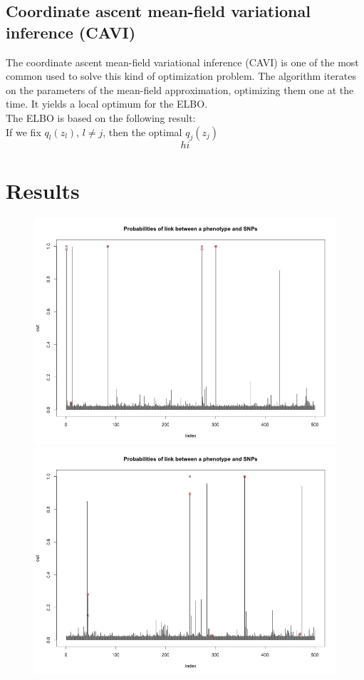 \documentclass{article}
\begin{document}
\subsection{Coordinate ascent mean-field variational inference \small{(CAVI)}}
The coordinate ascent mean-field variational inference (\small{CAVI}) is one of the most common used to solve this kind of optimization problem. The algorithm iterates on the parameters of the mean-field approximation, optimizing them one at the time. It yields a local optimum for the \small{ELBO}.\\
\newline
The \small{ELBO} is based on the following result:\\
If we fix $q_l(z_l)$, $l\neq j$, then the optimal $q_j(z_j)$
\begin{equation*}
hi
\end{equation*}
%
%
%
%
%
%
\newpage
\section{Results}
\begin{figure}
\includegraphics[width=5in]{images/multipleProba1.jpg}
\includegraphics[width=5in]{images/multipleProba2.jpg}
\end{figure}
\end{document}
